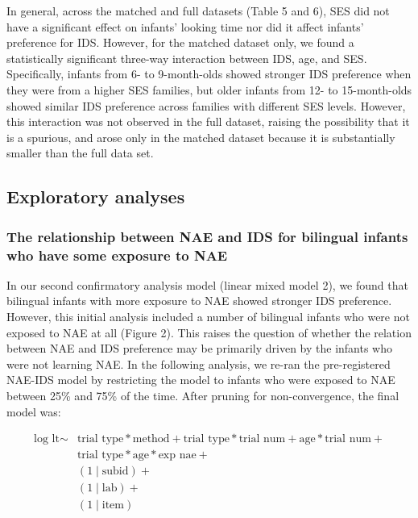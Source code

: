 \documentclass[english,,man,floatsintext]{apa6}
\begin{document}
In general, across the matched and full datasets (Table 5 and 6), SES did not have a significant effect on infants' looking time nor did it affect infants' preference for IDS. However, for the matched dataset only, we found a statistically significant three-way interaction between IDS, age, and SES. Specifically, infants from 6- to 9-month-olds showed stronger IDS preference when they were from a higher SES families, but older infants from 12- to 15-month-olds showed similar IDS preference across families with different SES levels. However, this interaction was not observed in the full dataset, raising the possibility that it is a spurious, and arose only in the matched dataset because it is substantially smaller than the full data set.

\hypertarget{exploratory-analyses}{%
\subsection{Exploratory analyses}\label{exploratory-analyses}}

\hypertarget{the-relationship-between-nae-and-ids-for-bilingual-infants-who-have-some-exposure-to-nae}{%
\subsubsection{The relationship between NAE and IDS for bilingual infants who have some exposure to NAE}\label{the-relationship-between-nae-and-ids-for-bilingual-infants-who-have-some-exposure-to-nae}}

In our second confirmatory analysis model (linear mixed model 2), we found that bilingual infants with more exposure to NAE showed stronger IDS preference. However, this initial analysis included a number of bilingual infants who were not exposed to NAE at all (Figure 2). This raises the question of whether the relation between NAE and IDS preference may be primarily driven by the infants who were not learning NAE. In the following analysis, we re-ran the pre-registered NAE-IDS model by restricting the model to infants who were exposed to NAE between 25\% and 75\% of the time. After pruning for non-convergence, the final model was:

\begin{equation}
\begin{split}
\text{log lt} \sim & \text{trial type} * \text{method} + \text{trial type} * \text{trial num} + \text{age} * \text{trial num} + \\
& \text{trial type} * \text{age} * \text{exp nae} + \\
& (1 \mid \text{subid}) + \\
& (1 \mid \text{lab}) + \\
& (1 \mid \text{item})
\end{split}
\end{equation}
\end{document}
